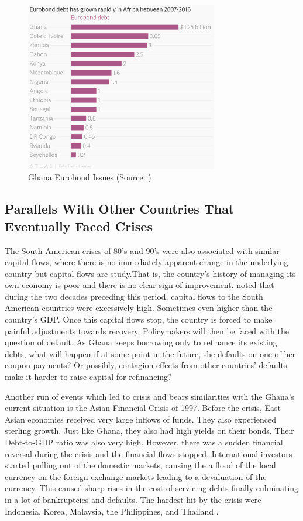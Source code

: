 \documentclass[a4paper, 12pt]{article}
\begin{document}
	\begin{figure}[h]
		\centering
		\includegraphics*[width=0.75\textwidth]{Data/ghana_eurobonds_compared_to_the_rest_of_africa.png}
		\caption[Eurobond Debt Issues in Sub-Sahara Africa]{Ghana Eurobond Issues (Source: \cite{Adegoke2017Oct})}
		\label{fig:ghanaeurobonds}
	\end{figure}
	
	\subsection{Parallels With Other Countries That Eventually Faced Crises}
	The South American crises of 80's and 90's were also associated with similar capital flows, where there is no immediately apparent change in the underlying country but capital flows are study.That is, the country's history of managing its own economy is poor and there is no clear sign of improvement.  noted that during the two decades preceding this period, capital flows to the South American countries were excessively high. Sometimes even higher than the country's GDP. Once this capital flows stop, the country is forced to make painful adjustments towards recovery. Policymakers will then be faced with the question of default. As Ghana keeps borrowing only to refinance its existing debts, what will happen if at some point in the future, she defaults on one of her coupon payments? Or possibly, contagion effects from other countries' defaults make it harder to raise capital for refinancing?
	
	
	Another run of events which led to crisis and bears similarities with the Ghana's current situation is the Asian Financial Crisis of 1997. Before the crisis, East Asian economies received very large inflows of funds. They also experienced sterling growth. Just like Ghana, they also had high yields on their bonds. Their Debt-to-GDP ratio was also very high. However, there was a sudden financial reversal during the crisis and the financial flows stopped. International investors started pulling out of the domestic markets, causing the a flood of the local currency on the foreign exchange markets leading to a devaluation of the currency. This caused sharp rises in the cost of servicing debts finally culminating in a lot of bankruptcies and defaults. The hardest hit by the crisis were Indonesia, Korea, Malaysia, the Philippines, and Thailand \cite{TheEastAsian}.
	
\end{document}
